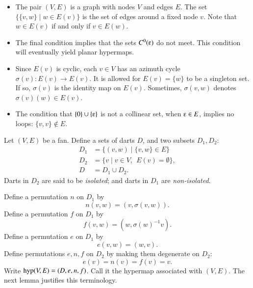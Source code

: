 \begin{remark}
\begin{itemize}
\item The pair $(V,E)$ is a graph with nodes $V$ and edges $E$.  The set
$\{\{v,w\}\mid w\in E(v)\}$ is the set of edges around a fixed node $v$.
Note that $w\in E(v)$ if and only if $v\in E(w)$.   
%
\item The final condition implies that the sets $C^0(\e)$
do not meet.   This condition will eventually yield planar
hypermaps.
%
\item
Since $E(v)$ is cyclic,
each $v\in V$ has an azimuth cycle $\sigma(v):E(v)\to E(v)$.
It is allowed for $E(v) = \{w\}$ to be a
singleton set. If so,
$\sigma(v)$ is the identity map on $E(v)$.
%
Sometimes,   $\sigma(v,w)$ denotes $\sigma(v)(w)\in E(v)$.
%
\item 
The condition that $\{0\}\cup \{\e\}$ is not a collinear set, when $\e\in
E$, implies no loops: $\{v,v\}\not\in E$.
%
\end{itemize}
\end{remark}


Let $(V,E)$ be a fan.  Define a sets of darts $D$, and
two subsets $D_1,D_2$:
    $$
    \begin{array}{lll}
    D_1 &= \{(v,w)\mid \{v,w\}\in E\}\\
    D_2 &= \{v \mid v\in V,\ \ E(v) = \emptyset\},\\
    D   &= D_1\cup D_2.
    \end{array}
    $$
Darts in $D_2$ are said to be {\it isolated}; and darts in $D_1$ are {\it non-isolated}.
%

Define a permutation $n$ on $D_1$ by
    $$n(v,w) = (v,\sigma(v,w)).$$
Define a permutation $f$ on $D_1$ by
    $$
    f (v,w) = (w,\sigma(w)^{-1} v).
    $$
Define a permutation $e$ on $D_1$ by
    $$
    e (v,w) = (w,v).
    $$
Define permutations $e,n,f$ on $D_2$ by making them degenerate on $D_2$:
    $$
    e (v) = n(v) = f(v) = v.
    $$
Write %
${\operatorname{hyp}}(V,E)=(D,e,n,f)$.  Call it %
the hypermap associated with $(V,E)$.  The next
lemma justifies this terminology.



